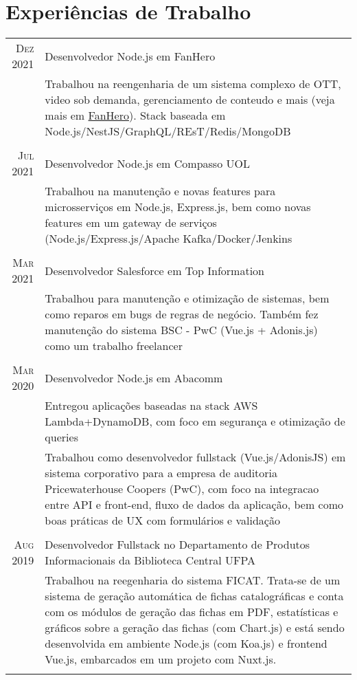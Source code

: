 \documentclass[a4paper,10pt]{article}
\begin{document}
\section{Experiências de Trabalho}
\begin{tabular}{r|p{11cm}}
\textsc{Dez 2021} & Desenvolvedor Node.js em FanHero
 \\ & \footnotesize{Trabalhou na reengenharia de um sistema complexo de OTT, video sob demanda, gerenciamento de conteudo e mais (veja mais em \href{https://fanhero.com}{FanHero}). Stack baseada em Node.js/NestJS/GraphQL/REsT/Redis/MongoDB}\\\\
\textsc{Jul 2021} & Desenvolvedor Node.js em Compasso UOL
 \\ & \footnotesize{Trabalhou na manutenção e novas features para microsserviços em Node.js, Express.js, bem como novas features em um gateway de serviços (Node.js/Express.js/Apache Kafka/Docker/Jenkins}\\\\
\textsc{Mar 2021} & Desenvolvedor Salesforce em Top Information
 \\ & \footnotesize{Trabalhou para manutenção e otimização de sistemas, bem como reparos em bugs de regras de negócio. Também fez manutenção do sistema BSC - PwC (Vue.js + Adonis.js) como um trabalho freelancer}\\\\
 \textsc{Mar 2020} & Desenvolvedor Node.js em Abacomm
 \\ & \footnotesize{Entregou aplicações baseadas na stack AWS Lambda+DynamoDB, com foco em segurança e otimização de queries} \\
 & \footnotesize{Trabalhou como desenvolvedor fullstack (Vue.js/AdonisJS) em sistema corporativo para a empresa de auditoria Pricewaterhouse Coopers (PwC), com foco na integracao entre API e front-end, fluxo de dados da aplicação, bem como boas práticas de UX com formulários e validação} \\\\
 \textsc{Aug 2019} & Desenvolvedor Fullstack no Departamento de Produtos Informacionais da Biblioteca Central UFPA\\ & \footnotesize{Trabalhou na reegenharia do sistema FICAT. Trata-se de um sistema de geração automática de fichas catalográficas e conta com os módulos de geração das fichas em PDF, estatísticas e gráficos sobre a geração das fichas (com Chart.js) e está sendo desenvolvida em ambiente Node.js (com Koa.js) e frontend Vue.js, embarcados em um projeto com Nuxt.js.} \\\\

\end{tabular}
\end{document}
